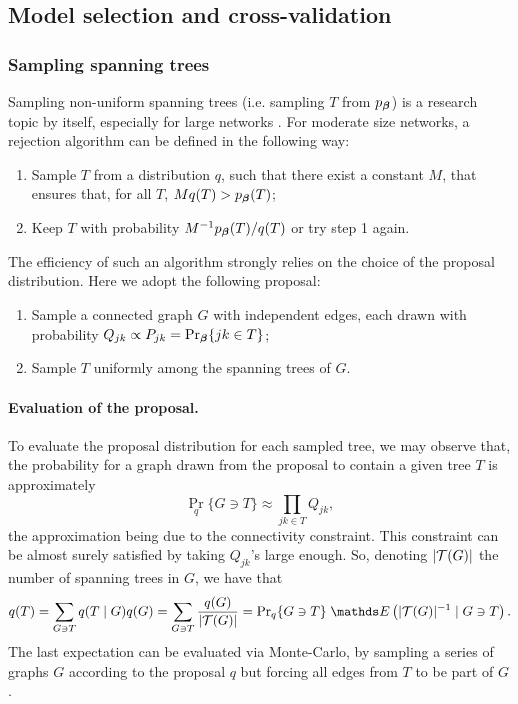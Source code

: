 \subsection{Model selection and cross-validation} \label{sec:modSel}

\subsubsection{Sampling spanning trees} \label{eq:sampTree}
Sampling non-uniform spanning trees (i.e. sampling $T$ from $p_{\boldsymbol{\beta}}$) is a research topic by itself, especially for large networks \citep[see][for a review]{DKP17}. For moderate size networks, a rejection algorithm \citep{Dev86} can be defined in the following way:
\begin{enumerate}
\item Sample $T$ from a distribution $q$, such that there exist a constant $M$, that ensures that, for all $T$, $M q(T) > p_{\boldsymbol{\beta}}(T)$;
\item Keep $T$ with probability $M^{-1} p_{\boldsymbol{\beta}}(T) / q(T)$ or try step 1 again.
\end{enumerate}
The efficiency of such an algorithm strongly relies on the choice of the proposal distribution. Here we adopt the following proposal:
\begin{enumerate}[label=\roman*]
\item Sample a connected graph $G$ with independent edges, each drawn with probability $Q_{jk} \propto P_{jk} = \Pr_{\boldsymbol{\beta}}\{ jk \in T\}$; 
\item Sample $T$ uniformly among the spanning trees of $G$.
\end{enumerate}
%
\paragraph{Evaluation of the proposal.}
To evaluate the proposal distribution for each sampled tree, we may observe that, the probability for a graph drawn from the proposal to contain a given tree $T$ is approximately
$$
{\Pr}_q\{G \ni T\} \approx \prod_{jk \in T} Q_{jk},
$$
the approximation being due to the connectivity constraint. This constraint can be almost surely satisfied by taking $Q_{jk}$'s large enough. So, denoting $|{\mathcal{T}}(G)|$ the number of spanning trees in $G$, we have that
\begin{align*}
q(T) 
= \sum_{G \ni T} q(T \mid G) q(G)  = \sum_{G \ni T} \frac{q(G)}{|\Tcal(G)|} 
= {\Pr}_q\{G \ni T\} \; \Esp\left(|\Tcal(G)|^{-1} \mid G \ni T \right).
\end{align*}
The last expectation can be evaluated via Monte-Carlo, by sampling a series of graphs $G$ according to the proposal $q$ but forcing all edges from $T$ to be part of $G$. 
%
